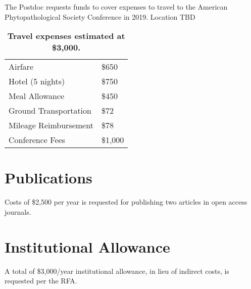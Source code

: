 \documentclass[12pt,letterpaper]{article}
\begin{document}
The Postdoc requests funds to cover expenses to travel to the American Phytopathological Society Conference in 2019.  Location TBD


\begin{table}[h!]
\centering
\begin{tabular}{ll}
\hline
	Airfare	& \$650 \\
	Hotel (5 nights) 	& \$750 \\
	Meal Allowance	& \$450 \\
	Ground Transportation	& \$72 \\
	Mileage Reimbursement	& \$78 \\
	Conference Fees	& \$1,000\\\hline
\end{tabular}
\caption{\textbf{Travel expenses estimated at \$3,000.}}
\end{table}


\section{Publications}
Costs of \$2,500 per year is requested for publishing two articles in open access journals.  

\section{Institutional Allowance}
A total of \$3,000/year institutional allowance, in lieu of indirect costs, is requested per the RFA.  
\end{document}
